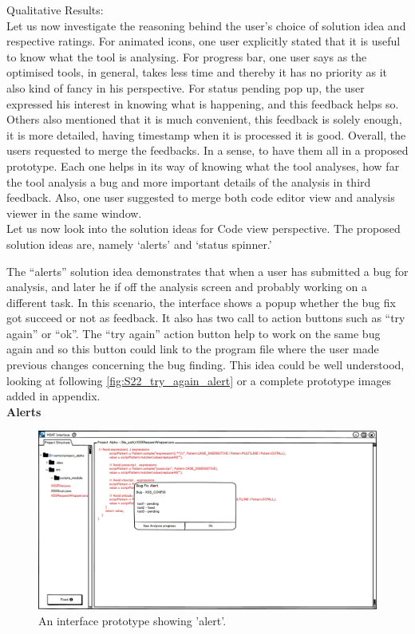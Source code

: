 Qualitative Results: \\

Let us now investigate the reasoning behind the user’s choice of solution idea and respective ratings. For animated icons, one user explicitly stated that it is useful to know what the tool is analysing. For progress bar, one user says as the optimised tools, in general, takes less time and thereby it has no priority as it also kind of fancy in his perspective. For status pending pop up, the user expressed his interest in knowing what is happening, and this feedback helps so. Others also mentioned that it is much convenient,  this feedback is solely enough, it is more detailed, having timestamp when it is processed it is good. Overall, the users requested to merge the feedbacks. In a sense, to have them all in a proposed prototype. Each one helps in its way of knowing what the tool analyses, how far the tool analysis a bug and more important details of the analysis in third feedback. Also, one user suggested to merge both code editor view and analysis viewer in the same window. \\

Let us now look into the solution ideas for Code view perspective. The proposed solution ideas are, namely ‘alerts’ and ‘status spinner.’ \\

\clearpage

The “alerts” solution idea demonstrates that when a user has submitted a bug for analysis, and later he if off the analysis screen and probably working on a different task. In this scenario,  the interface shows a popup whether the bug fix got succeed or not as feedback. It also has two call to action buttons such as “try again” or “ok”. The “try again” action button help to work on the same bug again and so this button could link to the program file where the user made previous changes concerning the bug finding. This idea could be well understood, looking at following \autoref{fig:S22_try_again_alert} or a complete prototype images added in appendix. \\


\textbf{Alerts}
\begin{figure}[hbt!]
	\centering
	\includegraphics[width=\linewidth]{figures/solution_ideas_snaps/S22_try_again_alert}
	\caption{An interface prototype showing 'alert'.}
	\label{fig:S22_try_again_alert}
\end{figure}

